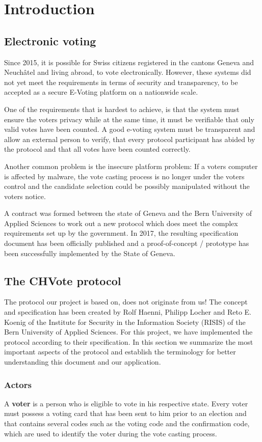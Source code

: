 \chapter{Introduction}
\section{Electronic voting}
Since 2015, it is possible for Swiss citizens registered in the cantons Geneva and Neuchâtel and living abroad, to vote electronically. However, these systems did not yet meet the requirements in terms of security and transparency, to be accepted as a secure E-Voting platform on a nationwide scale.

One of the requirements that is hardest to achieve, is that the system must ensure the voters privacy while at the same time, it must be verifiable that only valid votes have been counted. A good e-voting system must be transparent and allow an external person to verify, that every protocol participant has abided by the protocol and that all votes have been counted correctly.

Another common problem is the insecure platform problem: If a voters computer is affected by malware, the vote casting process is no longer under the voters control and the candidate selection could be possibly manipulated without the voters notice. 

A contract was formed between the state of Geneva and the Bern University of Applied Sciences to work out a new protocol which does meet the complex requirements set up by the government. In 2017, the resulting specification document has been officially published and a proof-of-concept / prototype has been successfully implemented by the State of Geneva. 

\section{The CHVote protocol}
The protocol our project is based on, does not originate from us! The concept and specification has been created by Rolf Haenni, Philipp Locher and Reto E. Koenig of the Institute for Security in the Information Society (RISIS) of the Bern University of Applied Sciences. For this project, we have implemented the protocol according to their specification. In this section we summarize the most important aspects of the protocol and establish the terminology for better understanding this document and our application.

\subsection{Actors}
A \textbf{voter} is a person who is eligible to vote in his respective state. Every voter must possess a voting card that has been sent to him prior to an election and that contains several codes such as the voting code and the confirmation code, which are used to identify the voter during the vote casting process.

